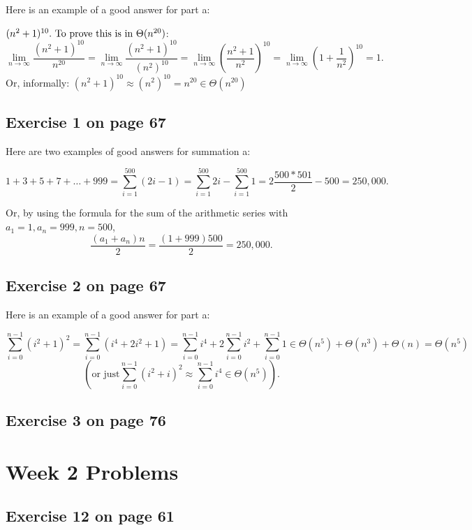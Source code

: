 \documentclass[12pt]{amsart}
\begin{document}
  Here is an example of a good answer for part a:

 $(n^2 + 1)^{10}.\) To prove this is in \(\Theta(n^{20})$:
\[ \lim_{n \rightarrow \infty} \frac{(n^2 + 1)^{10}}{n^{20}} =
   \lim_{n \rightarrow \infty} \frac{(n^2 + 1)^{10}}{(n^2)^{10}} =
   \lim_{n \rightarrow \infty} \left( \frac{n^2 + 1}{n^2} \right)^{10} =
   \lim_{n \rightarrow \infty} \left( 1 + \frac{1}{n^2} \right)^{10} = 1.
\]
 Or, informally: $(n^2 + 1)^{10} \approx (n^2)^{10} = n^{20} \in \Theta(n^{20})$


\subsection{Exercise 1 on page 67} $ $\\ 

  Here are two examples of good answers for summation a:

  \[1 + 3 + 5 + 7 + \ldots + 999 = \sum_{i = 1}^{500} (2i - 1) = \sum_{i = 1}^{500} 2i - \sum_{i = 1}^{500} 1
= 2 \frac{500 * 501}{2} - 500 = 250,000.\]

Or, by using the formula for the sum of the arithmetic series with
  $a_1 = 1, a_n = 999, n = 500$, 
  \[\frac{(a_1 + a_n)n}{2} = \frac{(1+999)500}{2} = 250,000.\]

\subsection{Exercise 2 on page 67} $ $\\ 

  Here is an example of a good answer for part a:

\[ \sum_{i = 0}^{n - 1} (i^2 + 1)^2 = \sum_{i = 0}^{n - 1}(i^4 + 2i^2 + 1) = \sum_{i = 0}^{n - 1} i^4 + 2 \sum_{i = 0}^{n - 1} i^2 + \sum_{i = 0}^{n - 1} 1 \in \Theta(n^5) + \Theta(n^3) + \Theta(n) = \Theta(n^5)
\]
\[(\mbox{or just} \sum_{i = 0}^{n - 1} (i^2 + i)^2 \approx \sum_{i = 0}^{n - 1} i^4 \in \Theta(n^5)).
\]


\subsection{Exercise 3 on page 76}

   
\section{Week 2 Problems}

\subsection{Exercise 12 on page 61}
\end{document}
